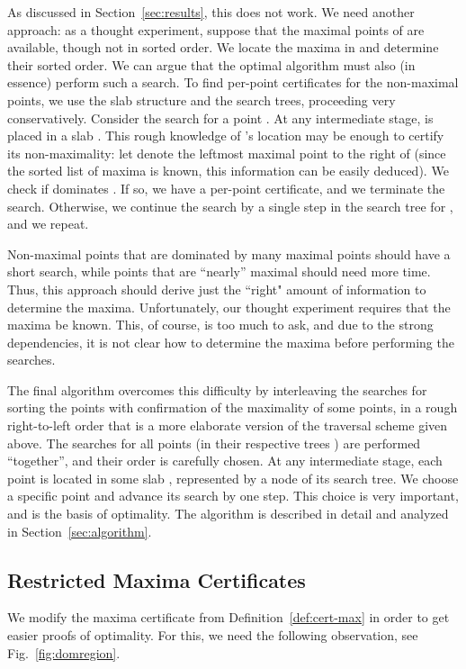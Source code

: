 \documentclass[letterpaper,11pt]{article}
\begin{document}
As discussed in Section~\ref{sec:results}, 
this does not work. We need another approach:
as a thought experiment, suppose that the maximal
points of  are available, though not in sorted order. 
We locate the maxima in  and 
determine their sorted order. 
We can argue that the optimal algorithm must also
(in essence) perform such a search. To find 
per-point certificates for the non-maximal points,
we use the slab structure  and the search trees,
proceeding very conservatively.
Consider the search for a point . At any intermediate
stage,  is placed in a slab .
This rough knowledge of 's location 
may be enough to certify 
its non-maximality: 
let  denote the leftmost maximal
point to the right of  (since the 
sorted list of maxima is known, this information
can be easily deduced). We check if  dominates 
. If so, we have a per-point 
certificate, and we terminate the search. 
Otherwise, we continue the search by a single 
step in the search tree for , and we repeat. 

Non-maximal points that are dominated 
by many maximal points should 
have a short search, while points
that are ``nearly'' maximal should 
need more time. 
Thus, this approach
should derive just the ``right" amount 
of information to determine the maxima.
Unfortunately, our thought experiment requires 
that the maxima be known.
This, of course, is too much to ask, and 
due to the strong dependencies, it is not clear
how to determine the maxima before performing 
the searches.

The final algorithm overcomes this 
difficulty by interleaving the searches 
for sorting the points with confirmation
of the maximality of some points, in 
a rough right-to-left order
that is a more elaborate version of the traversal scheme given
above. 
The searches for all points  (in their 
respective trees ) are performed 
``together'', and their order is carefully chosen. 
At any intermediate
stage, each point  is located in 
some slab , represented by
a node of its search tree. We 
choose a specific point and advance
its search by one step. This choice is 
very important, and is the basis
of optimality. The algorithm is 
described in detail and analyzed in 
Section~\ref{sec:algorithm}.

\subsection{Restricted Maxima Certificates}

We modify the maxima certificate 
from Definition~\ref{def:cert-max} in order
to get easier proofs of optimality.
For this, we need the following observation,
see Fig.~\ref{fig:domregion}.
\end{document}
